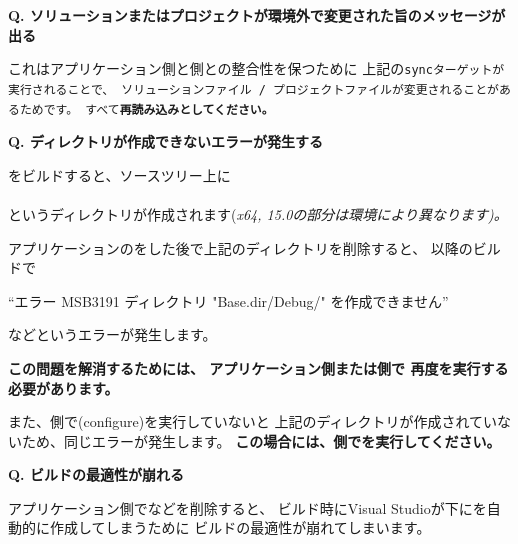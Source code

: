 \bf{Q. ソリューションまたはプロジェクトが環境外で変更された旨のメッセージが出る}

\medskip
これはアプリケーション側と\SprLib 側との整合性を保つために
上記の\tt{sync}ターゲットが実行されることで、
ソリューションファイル / プロジェクトファイルが変更されることがあるためです。
すべて\bf{再読み込み}としてください。


\thinrule{\linewidth}

\bf{Q. ディレクトリが作成できないエラーが発生する}

\medskip
\SprLib をビルドすると、ソースツリー上に \\
\hspace{10pt} \\
というディレクトリが作成されます(\it{x64}, \it{15.0}の部分は環境により異なります)。

アプリケーションの\cmake をした後で上記のディレクトリを削除すると、
以降のビルドで

\hspace{20pt}``エラー MSB3191 ディレクトリ "Base.dir/Debug/" を作成できません''

などというエラーが発生します。

\bf{この問題を解消するためには、
アプリケーション側または\SprLib 側で 再度\cmake を実行する必要があります。}

また、\SprLib 側で\cmake (configure)を実行していないと 
上記のディレクトリが作成されていないため、同じエラーが発生します。
\bf{この場合には、\SprLib 側で\cmake を実行してください。}

\thinrule{\linewidth}

\bf{Q. ビルドの最適性が崩れる}
\label{subsec:QandA:CrumbleBuildOptimizeation}

\medskip
アプリケーション側でなどを削除すると、
ビルド時にVisual Studioが\BldDir 下にを自動的に作成してしまうために
ビルドの最適性が崩れてしまいます。


